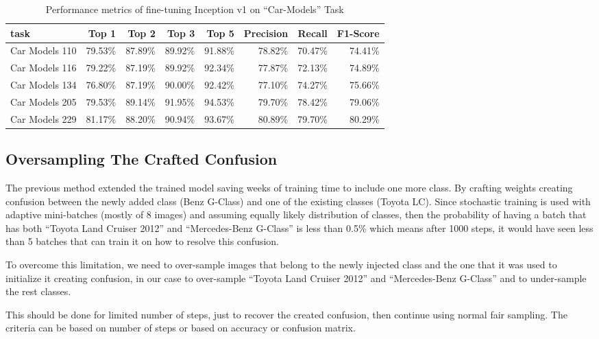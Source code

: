\begin{table*}\caption{Performance metrics of fine-tuning Inception v1 on ``Car-Models'' Task}\label{table:car-models-metrics}
\begin{adjustwidth}{-2in}{-2in} %
\centering
\begin{tabular}{@{}lrrrrrrr@{}}
\toprule
task            &   Top 1 &   Top 2 &   Top 3 &   Top 5 & Precision & Recall & F1-Score \\
\midrule
Car Models 110  & 79.53\% & 87.89\% & 89.92\% & 91.88\% & 78.82\% & 70.47\% & 74.41\% \\
Car Models 116  & 79.22\% & 87.19\% & 89.92\% & 92.34\% & 77.87\% & 72.13\% & 74.89\% \\
Car Models 134  & 76.80\% & 87.19\% & 90.00\% & 92.42\% & 77.10\% & 74.27\% & 75.66\% \\
Car Models 205  & 79.53\% & 89.14\% & 91.95\% & 94.53\% & 79.70\% & 78.42\% & 79.06\% \\
Car Models 229  & 81.17\% & 88.20\% & 90.94\% & 93.67\% & 80.89\% & 79.70\% & 80.29\% \\
\bottomrule
\end{tabular}
\end{adjustwidth}
\end{table*}


\subsection{Oversampling The Crafted Confusion}

The previous method extended the trained model saving weeks of training time to include one more class.
By crafting weights creating confusion between the newly added class (Benz G-Class) and one of the existing classes (Toyota LC).
Since stochastic training is used with adaptive mini-batches (mostly of 8 images) and
assuming equally likely distribution of classes,
then the probability of having a batch that has both ``Toyota Land Cruiser 2012'' and ``Mercedes-Benz G-Class''
is less than 0.5\% which means after 1000 steps,
it would have seen less than 5 batches that can train it on how to resolve this confusion.

To overcome this limitation, we need to over-sample images that belong to the newly injected class
and the one that it was used to initialize it creating confusion,
in our case to over-sample ``Toyota Land Cruiser 2012'' and ``Mercedes-Benz G-Class''
and to under-sample the rest classes.

This should be done for limited number of steps, just to recover the created confusion,
then continue using normal fair sampling.
The criteria can be based on number of steps or based on accuracy or confusion matrix.

